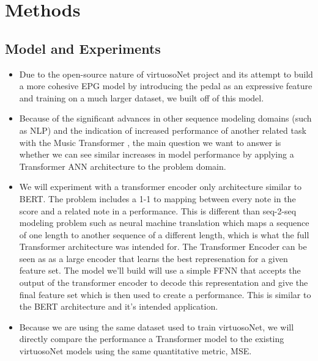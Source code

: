 \chapter{Methods}\label{ch:ch3}

\section{Model and Experiments}
\begin{itemize}
    \item Due to the open-source nature of virtuosoNet project and its attempt to build a more cohesive EPG model by introducing the pedal as an expressive feature and training on a much larger dataset, we built off of this model. 
    \item Because of the significant advances in other sequence modeling domains (such as NLP) and the indication of increased performance of another related task with the Music Transformer \cite{huang2018music}, the main question we want to answer is whether we can see similar increases in model performance by applying a Transformer ANN architecture to the problem domain. 
    \item We will experiment with a transformer encoder only architecture similar to BERT. The problem includes a 1-1 to mapping between every note in the score and a related note in a performance. This is different than seq-2-seq modeling problem such as neural machine translation which maps a sequence of one length to another sequence of a different length, which is what the full Transformer architecture was intended for. The Transformer Encoder can be seen as as a large encoder that learns the best represenation for a given feature set. The model we'll build will use a simple FFNN that accepts the output of the transformer encoder to decode this representation and give the final feature set which is then used to create a performance. This is similar to the BERT architecture and it's intended application. 
    \item Because we are using the same dataset used to train virtuosoNet, we will directly compare the performance a Transformer model to the existing virtuosoNet models using the same quantitative metric, MSE. 
    
\end{itemize}

